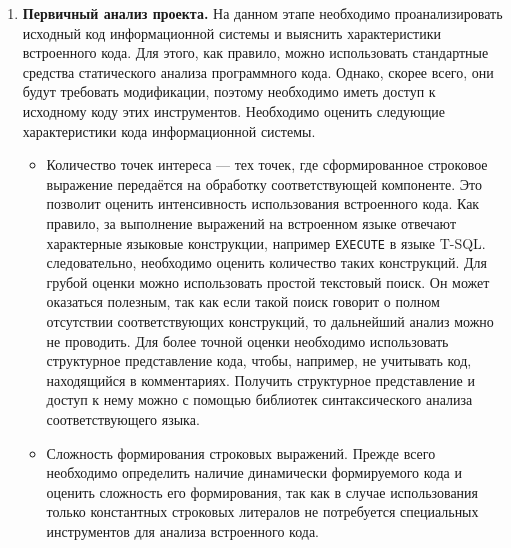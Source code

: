 \begin{enumerate}
  \item \textbf{Первичный анализ проекта.} На данном этапе необходимо проанализировать исходный код информационной системы и выяснить характеристики встроенного кода. Для этого, как правило, можно использовать стандартные средства статического анализа программного кода. Однако, скорее всего, они будут требовать модификации, поэтому необходимо иметь доступ к исходному коду этих инструментов. Необходимо оценить следующие характеристики кода информационной системы.
  \begin{itemize}
    \item Количество точек интереса --- тех точек, где сформированное строковое выражение передаётся на обработку соответствующей компоненте. Это позволит оценить интенсивность использования встроенного кода. Как правило, за выполнение выражений на встроенном языке отвечают характерные языковые конструкции, например \verb|EXECUTE| в языке T-SQL. следовательно, необходимо оценить количество таких конструкций. Для грубой оценки можно использовать простой текстовый поиск. Он может оказаться полезным, так как если такой поиск говорит о полном отсутствии соответствующих конструкций, то дальнейший анализ можно не проводить. Для более точной оценки необходимо использовать структурное представление кода, чтобы, например, не учитывать код, находящийся в комментариях. Получить структурное представление и доступ к нему можно с помощью библиотек синтаксического анализа соответствующего языка.
    
    \item Сложность формирования строковых выражений. Прежде всего необходимо определить наличие динамически формируемого кода и оценить сложность его формирования, так как в случае использования только константных строковых литералов не потребуется специальных инструментов для анализа встроенного кода.
    

\end{itemize}
\end{enumerate}
